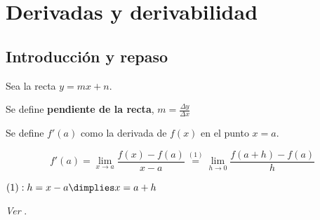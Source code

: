 
\newpage\section{Derivadas y derivabilidad}

\subsection{Introducción y repaso}
\begin{defn}
Sea la recta $y=mx+n$.

Se define \textbf{pendiente de la recta}, $m=\frac{\Delta y}{\Delta x}$
\end{defn}

\begin{defn}
Se define $f'(a)$ como la derivada de $f(x)$ en el punto $x=a$.

\[f'(a) = \lim_{x\to a}\frac{f(x)-f(a)}{x-a} \overset{(1)}{=} \lim_{h\to 0}\frac{f(a+h)-f(a)}{h}\]

$(1): h=x-a \dimplies x=a+h$

\textit{Ver }.
\end{defn}



